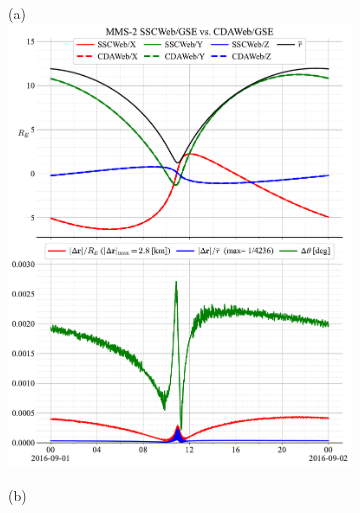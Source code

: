\documentclass[draft]{agujournal2019}
\begin{document}
\begin{figure}[h]
     \begin{subfigure}[b]{0.49\textwidth}
         (a)
         \centering
         \includegraphics[width=\textwidth]{code/figures/ephemeris/MMS-2_SSCWeb-GSE_vs_CDAWeb-GSE.pdf}
     \end{subfigure}
     \begin{subfigure}[b]{0.49\textwidth}
         (b)
         \centering

\end{subfigure}
\end{figure}
\end{document}
